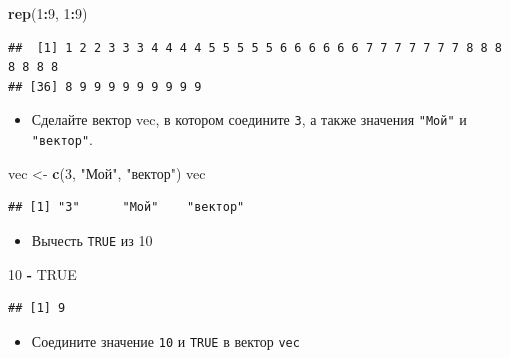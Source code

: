 \documentclass[]{book}
\newenvironment{Shaded}{\begin{snugshade}}{\end{snugshade}}
\newcommand{\DecValTok}[1]{\textcolor[rgb]{0.00,0.00,0.81}{#1}}
\newcommand{\KeywordTok}[1]{\textcolor[rgb]{0.13,0.29,0.53}{\textbf{#1}}}
\newcommand{\NormalTok}[1]{#1}
\newcommand{\OperatorTok}[1]{\textcolor[rgb]{0.81,0.36,0.00}{\textbf{#1}}}
\newcommand{\OtherTok}[1]{\textcolor[rgb]{0.56,0.35,0.01}{#1}}
\newcommand{\StringTok}[1]{\textcolor[rgb]{0.31,0.60,0.02}{#1}}
\providecommand{\tightlist}{%
  \setlength{\itemsep}{0pt}\setlength{\parskip}{0pt}}
\begin{document}
\begin{Shaded}
\begin{Highlighting}[]
\KeywordTok{rep}\NormalTok{(}\DecValTok{1}\OperatorTok{:}\DecValTok{9}\NormalTok{, }\DecValTok{1}\OperatorTok{:}\DecValTok{9}\NormalTok{)}
\end{Highlighting}
\end{Shaded}

\begin{verbatim}
##  [1] 1 2 2 3 3 3 4 4 4 4 5 5 5 5 5 6 6 6 6 6 6 7 7 7 7 7 7 7 8 8 8 8 8 8 8
## [36] 8 9 9 9 9 9 9 9 9 9
\end{verbatim}

\begin{itemize}
\tightlist
\item
  Сделайте вектор vec, в котором соедините \texttt{3}, а также значения \texttt{"Мой"} и \texttt{"вектор"}.
\end{itemize}

\begin{Shaded}
\begin{Highlighting}[]
\NormalTok{vec <-}\StringTok{ }\KeywordTok{c}\NormalTok{(}\DecValTok{3}\NormalTok{, }\StringTok{"Мой"}\NormalTok{, }\StringTok{"вектор"}\NormalTok{)}
\NormalTok{vec}
\end{Highlighting}
\end{Shaded}

\begin{verbatim}
## [1] "3"      "Мой"    "вектор"
\end{verbatim}

\begin{itemize}
\tightlist
\item
  Вычесть \texttt{TRUE} из 10
\end{itemize}

\begin{Shaded}
\begin{Highlighting}[]
\DecValTok{10} \OperatorTok{-}\StringTok{ }\OtherTok{TRUE}
\end{Highlighting}
\end{Shaded}

\begin{verbatim}
## [1] 9
\end{verbatim}

\begin{itemize}
\tightlist
\item
  Соедините значение \texttt{10} и \texttt{TRUE} в вектор \texttt{vec}
\end{itemize}
\end{document}

